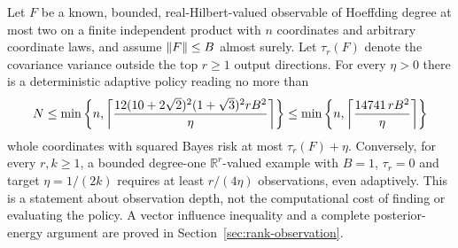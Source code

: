 \begin{theorem}\label{thm:rankadaptive}
Let $F$ be a known, bounded, real-Hilbert-valued observable of Hoeffding degree at most two on a finite independent product with $n$ coordinates and arbitrary coordinate laws, and assume $\lVert F\rVert\le B$ almost surely. Let $\tau_r(F)$ denote the covariance variance outside the top $r\ge1$ output directions. For every $\eta>0$ there is a deterministic adaptive policy reading no more than
\begin{equation}\label{eq:rankcap}
 N\le\min\left\{n,\left\lceil\frac{12(10+2\sqrt2)^2(1+\sqrt3)^2 r B^2}{\eta}\right\rceil\right\}
 \le\min\left\{n,\left\lceil\frac{14741\,rB^2}{\eta}\right\rceil\right\}
\end{equation}
whole coordinates with squared Bayes risk at most $\tau_r(F)+\eta$. Conversely, for every $r,k\ge1$, a bounded degree-one $\mathbb R^r$-valued example with $B=1$, $\tau_r=0$ and target $\eta=1/(2k)$ requires at least $r/(4\eta)$ observations, even adaptively. This is a statement about observation depth, not the computational cost of finding or evaluating the policy. A vector influence inequality and a complete posterior-energy argument are proved in Section~\ref{sec:rank-observation}.
\end{theorem}

